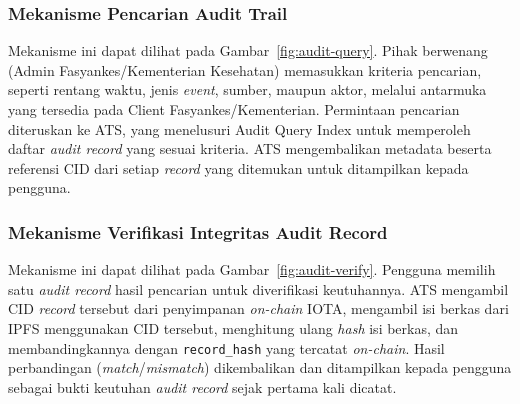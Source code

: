 \subsubsection{Mekanisme Pencarian Audit Trail}
Mekanisme ini dapat dilihat pada Gambar~\ref{fig:audit-query}.
Pihak berwenang (Admin Fasyankes/Kementerian Kesehatan) memasukkan kriteria
pencarian, seperti rentang waktu, jenis \textit{event}, sumber, maupun
aktor, melalui antarmuka yang tersedia pada Client Fasyankes/Kementerian.
Permintaan pencarian diteruskan ke ATS, yang menelusuri Audit Query Index
untuk memperoleh daftar \textit{audit record} yang sesuai kriteria. ATS
mengembalikan metadata beserta referensi CID dari setiap \textit{record}
yang ditemukan untuk ditampilkan kepada pengguna.

\subsubsection{Mekanisme Verifikasi Integritas Audit Record}
Mekanisme ini dapat dilihat pada Gambar~\ref{fig:audit-verify}.
Pengguna memilih satu \textit{audit record} hasil pencarian untuk
diverifikasi keutuhannya. ATS mengambil CID \textit{record} tersebut dari
penyimpanan \textit{on-chain} IOTA, mengambil isi berkas dari IPFS
menggunakan CID tersebut, menghitung ulang \textit{hash} isi berkas, dan
membandingkannya dengan \texttt{record\_hash} yang tercatat \textit{on-chain}.
Hasil perbandingan (\textit{match}/\textit{mismatch}) dikembalikan dan
ditampilkan kepada pengguna sebagai bukti keutuhan \textit{audit record}
sejak pertama kali dicatat.